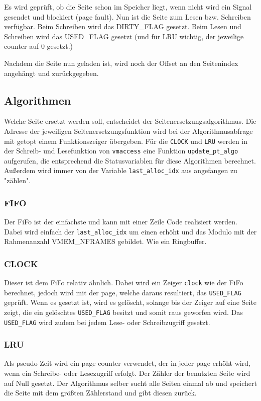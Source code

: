 \documentclass[
   draft=false
  ,paper=a4
  ,twoside=false
  ,fontsize=11pt
  ,headsepline
  ,BCOR10mm
  ,DIV11
  ,parskip=full+
]{scrartcl} %
\begin{document}
        Es wird geprüft, ob die Seite schon im Speicher liegt, wenn nicht wird 
        ein Signal gesendet und blockiert (page fault). Nun ist die Seite zum
        Lesen bzw. Schreiben verfügbar. Beim Schreiben wird das DIRTY\_FLAG 
        gesetzt. Beim Lesen und Schreiben wird das USED\_FLAG gesetzt (und für
        LRU wichtig, der jeweilige counter auf 0 gesetzt.)

        Nachdem die Seite nun geladen ist, wird noch der Offset an den 
        Seitenindex angehängt und zurückgegeben. 
        
    \subsection{Algorithmen}
    Welche Seite ersetzt werden soll, entscheidet der 
    Seitenersetzungsalgorithmus.
    Die Adresse der jeweiligen Seitenersetzungsfunktion wird bei der 
    Algorithmusabfrage mit getopt einem Funktionszeiger übergeben.
    Für die \texttt{CLOCK} und \texttt{LRU} werden in der Schreib- und 
    Lesefunktion von \texttt{vmaccess} eine Funktion 
    \texttt{update\_pt\_algo} aufgerufen, die entsprechend die Statusvariablen
    für diese Algorithmen berechnet. 
    Außerdem wird immer von der Variable \texttt{last\_alloc\_idx} aus 
    angefangen zu "{}zählen"{}.

        \subsubsection{FIFO}
        Der FiFo ist der einfachste und kann mit einer Zeile Code realisiert werden.
        Dabei wird einfach der \texttt{last\_alloc\_idx} um einen erhöht 
        und das Modulo mit der Rahmenanzahl VMEM\_NFRAMES gebildet. Wie ein 
        Ringbuffer.

        \subsubsection{CLOCK}
        Dieser ist dem FiFo relativ ähnlich. Dabei wird ein Zeiger 
        \texttt{clock} wie der FiFo berechnet, jedoch wird mit der page, welche
        daraus resultiert, das \texttt{USED\_FLAG} geprüft. Wenn es gesetzt ist,
        wird es gelöscht, solange bis der Zeiger auf eine Seite zeigt, die ein 
        gelöschtes \texttt{USED\_FLAG} besitzt und somit raus geworfen wird.
        Das \texttt{USED\_FLAG} wird zudem bei jedem Lese- oder Schreibzugriff
        gesetzt.

        \subsubsection{LRU}
        Als pseudo Zeit wird ein page counter verwendet, der in jeder page 
        erhöht wird, wenn ein Schreibe- oder Lesezugriff erfolgt. 
        Der Zähler der benutzten Seite wird auf Null gesetzt. 
        Der Algorithmus selber sucht alle Seiten einmal ab und speichert die 
        Seite mit dem größten Zählerstand und gibt diesen zurück.
\end{document}
